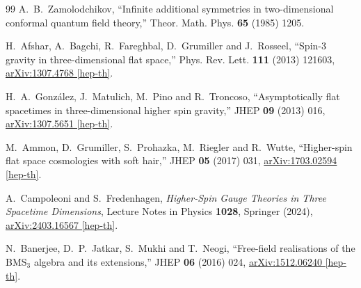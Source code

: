 \documentclass[11pt,a4paper]{article}
\numberwithin{equation}{section}
\theoremstyle{remark}
\begin{document}
\begin{thebibliography}{99}
A.~B.~Zamolodchikov,
``Infinite additional symmetries in two-dimensional conformal quantum field theory,''
Theor. Math. Phys. \textbf{65} (1985) 1205.

H.~Afshar, A.~Bagchi, R.~Fareghbal, D.~Grumiller and J.~Rosseel,
``Spin-3 gravity in three-dimensional flat space,''
Phys. Rev. Lett. \textbf{111} (2013) 121603,
\href{https://arxiv.org/abs/1307.4768}{arXiv:1307.4768 [hep-th]}.

H.~A.~Gonz\'alez, J.~Matulich, M.~Pino and R.~Troncoso,
``Asymptotically flat spacetimes in three-dimensional higher spin gravity,''
JHEP \textbf{09} (2013) 016,
\href{https://arxiv.org/abs/1307.5651}{arXiv:1307.5651 [hep-th]}.

M.~Ammon, D.~Grumiller, S.~Prohazka, M.~Riegler and R.~Wutte,
``Higher-spin flat space cosmologies with soft hair,''
JHEP \textbf{05} (2017) 031,
\href{https://arxiv.org/abs/1703.02594}{arXiv:1703.02594 [hep-th]}.

A.~Campoleoni and S.~Fredenhagen,
\emph{Higher-Spin Gauge Theories in Three Spacetime Dimensions},
Lecture Notes in Physics \textbf{1028}, Springer (2024),
\href{https://arxiv.org/abs/2403.16567}{arXiv:2403.16567 [hep-th]}.

N.~Banerjee, D.~P.~Jatkar, S.~Mukhi and T.~Neogi,
``Free-field realisations of the BMS$_3$ algebra and its extensions,''
JHEP \textbf{06} (2016) 024,
\href{https://arxiv.org/abs/1512.06240}{arXiv:1512.06240 [hep-th]}.

\end{thebibliography}
\end{document}
